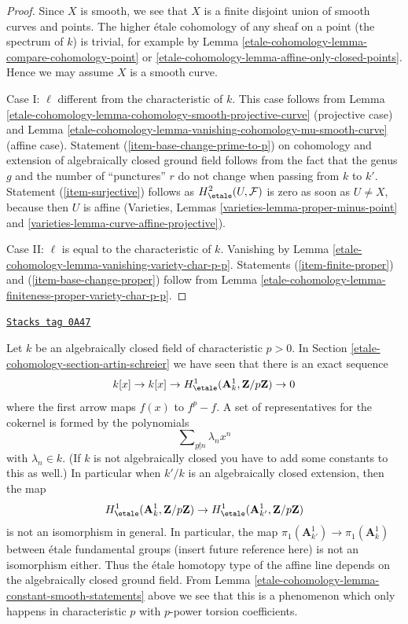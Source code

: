 \begin{proof}
Since $X$ is smooth, we see that $X$ is a finite disjoint union of
smooth curves and points. The higher \'etale cohomology of any sheaf
on a point (the spectrum of $k$) is trivial, for example by
Lemma \ref{etale-cohomology-lemma-compare-cohomology-point}
or \ref{etale-cohomology-lemma-affine-only-closed-points}.
Hence we may assume $X$ is a smooth curve.

\medskip\noindent
Case I: $\ell$ different from the characteristic of $k$.
This case follows from
Lemma \ref{etale-cohomology-lemma-cohomology-smooth-projective-curve}
(projective case) and
Lemma \ref{etale-cohomology-lemma-vanishing-cohomology-mu-smooth-curve}
(affine case). Statement (\ref{item-base-change-prime-to-p})
on cohomology and extension of algebraically closed ground
field follows from the fact that the genus $g$ and the number
of ``punctures'' $r$ do not change when passing from $k$ to $k'$.
Statement (\ref{item-surjective}) follows as $H^2_\etale(U, \mathcal{F})$
is zero as soon as $U \not = X$, because then $U$ is affine
(Varieties, Lemmas \ref{varieties-lemma-proper-minus-point} and
\ref{varieties-lemma-curve-affine-projective}).

\medskip\noindent
Case II: $\ell$ is equal to the characteristic of $k$.
Vanishing by Lemma \ref{etale-cohomology-lemma-vanishing-variety-char-p-p}.
Statements (\ref{item-finite-proper}) and (\ref{item-base-change-proper})
follow from
Lemma \ref{etale-cohomology-lemma-finiteness-proper-variety-char-p-p}.
\end{proof}

\begin{remark}

\label{etale-cohomology-remark-invariance}
\href{https://stacks.math.columbia.edu/tag/0A47}{\texttt{Stacks tag 0A47}}

Let $k$ be an algebraically closed field of characteristic $p > 0$.
In Section \ref{etale-cohomology-section-artin-schreier} we have seen that there is
an exact sequence
$$
k[x] \to k[x] \to
H^1_\etale(\mathbf{A}^1_k, \mathbf{Z}/p\mathbf{Z}) \to 0
$$
where the first arrow maps $f(x)$ to $f^p - f$. A set of representatives
for the cokernel is formed by the polynomials
$$
\sum\nolimits_{p \not | n} \lambda_n x^n
$$
with $\lambda_n \in k$. (If $k$ is not algebraically closed
you have to add some constants to this as well.) In particular
when $k'/k$ is an algebraically closed extension, then
the map
$$
H^1_\etale(\mathbf{A}^1_k, \mathbf{Z}/p\mathbf{Z})
\to
H^1_\etale(\mathbf{A}^1_{k'}, \mathbf{Z}/p\mathbf{Z})
$$
is not an isomorphism in general. In particular, the map
$\pi_1(\mathbf{A}^1_{k'}) \to \pi_1(\mathbf{A}^1_k)$
between \'etale fundamental groups (insert future reference here)
is not an isomorphism either. Thus the \'etale homotopy type
of the affine line depends on the algebraically closed ground field.
From Lemma \ref{etale-cohomology-lemma-constant-smooth-statements} above we see that
this is a phenomenon which only happens in characteristic $p$
with $p$-power torsion coefficients.
\end{remark}

